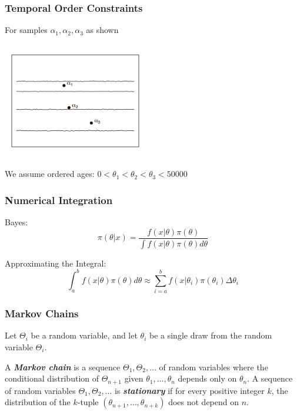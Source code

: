 \documentclass{beamer} %
\begin{document}
\begin{frame}
	\frametitle{Temporal Order Constraints}
	
	For samples $\alpha_1, \alpha_2, \alpha_3$ as shown

	\begin{center}
	\includegraphics[width=2.5in, height = 2in]{OneSedimentLayer}
	\end{center}
	
	We assume ordered ages: $0 < \theta_1 < \theta_2 <  \theta_3 < 50000$
	
\end{frame}



\begin{frame}

	\frametitle{Numerical Integration}
	Bayes:
	\[  
\pi(\theta|x) = \frac{f(x|\theta)\pi(\theta)}{\int f(x|\theta)\pi(\theta) d\theta }
 \]
	
	Approximating the Integral:
	\[
\int_a^b f(x|\theta)\pi(\theta) d\theta \approx \sum_{i=a}^{b} f(x | \theta_i ) \pi( \theta_i ) \Delta \theta_i
\]

\end{frame}


\begin{frame}
	\frametitle{Markov Chains}
	
	Let $\Theta_i$ be a random variable, and let $\theta_i$ be a single draw from the random variable $\Theta_i$. 
	
	A \textbf{\textit{Markov chain}} is a sequence $\Theta_1, \Theta_2, \dotso$ of random variables where the conditional distribution of $\Theta_{n+1}$ given $\theta_1, \dotso , \theta_n$ depends only on $\theta_n$.
	\hfill \break
	 A sequence of random variables $\Theta_1, \Theta_2, \dotso$ is \textbf{\textit{stationary}} if for every positive integer $k$, the distribution of the $k$-tuple $(\theta_{n+1}, \dotso , \theta_{n+k})$ does not depend on $n$. 
 
	

\end{frame}
\end{document}
